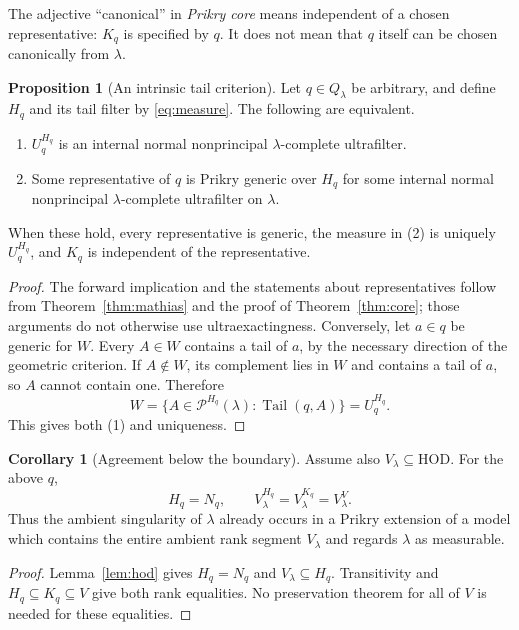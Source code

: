 \documentclass[11pt,letterpaper]{article}
\theoremstyle{definition}
\newtheorem{proposition}[definition]{Proposition}
\newtheorem{corollary}[definition]{Corollary}
\numberwithin{equation}{section}
\newcommand{\HOD}{\mathrm{HOD}}
\newcommand{\Tail}{\operatorname{Tail}}
\newcommand{\powM}[2]{\mathcal P^{#1}(#2)}
\begin{document}
The adjective ``canonical'' in \emph{Prikry core} means independent of a chosen representative: $K_q$ is specified by $q$. It does not mean that $q$ itself can be chosen canonically from $\lambda$.

\begin{proposition}[An intrinsic tail criterion]\label{prop:intrinsic}
Let $q\in Q_\lambda$ be arbitrary, and define $H_q$ and its tail filter by \eqref{eq:measure}. The following are equivalent.
\begin{enumerate}
\item $U_q^{H_q}$ is an internal normal nonprincipal $\lambda$-complete ultrafilter.
\item Some representative of $q$ is Prikry generic over $H_q$ for some internal normal nonprincipal $\lambda$-complete ultrafilter on $\lambda$.
\end{enumerate}
When these hold, every representative is generic, the measure in (2) is uniquely $U_q^{H_q}$, and $K_q$ is independent of the representative.
\end{proposition}

\begin{proof}
The forward implication and the statements about representatives follow from Theorem~\ref{thm:mathias} and the proof of Theorem~\ref{thm:core}; those arguments do not otherwise use ultraexactingness. Conversely, let $a\in q$ be generic for $W$. Every $A\in W$ contains a tail of $a$, by the necessary direction of the geometric criterion. If $A\notin W$, its complement lies in $W$ and contains a tail of $a$, so $A$ cannot contain one. Therefore
\[
 W=\{A\in\powM{H_q}{\lambda}:\Tail(q,A)\}=U_q^{H_q}.
\]
This gives both (1) and uniqueness.
\end{proof}

\begin{corollary}[Agreement below the boundary]\label{cor:boundary}
Assume also $V_\lambda\subseteq\HOD$. For the above $q$,
\[
 H_q=N_q,\qquad
 V_\lambda^{H_q}=V_\lambda^{K_q}=V_\lambda^V.
\]
Thus the ambient singularity of $\lambda$ already occurs in a Prikry extension of a model which contains the entire ambient rank segment $V_\lambda$ and regards $\lambda$ as measurable.
\end{corollary}

\begin{proof}
Lemma~\ref{lem:hod} gives $H_q=N_q$ and $V_\lambda\subseteq H_q$. Transitivity and $H_q\subseteq K_q\subseteq V$ give both rank equalities. No preservation theorem for all of $V$ is needed for these equalities.
\end{proof}
\end{document}
